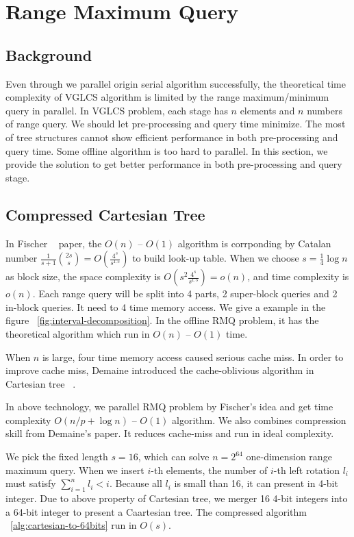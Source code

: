 \section{Range Maximum Query}
\label{sec:parallelRMQ}

\subsection{Background}

Even through we parallel origin serial algorithm successfully, the theoretical time complexity of VGLCS algorithm is limited by the range maximum/minimum query in parallel.  In VGLCS problem, each stage has $n$ elements and $n$ numbers of range query. We should let pre-processing and query time minimize. The most of tree structures cannot show efficient performance in both pre-processing and query time. Some offline algorithm is too hard to parallel. In this section, we provide the solution to get better performance in both pre-processing and query stage.

\subsection{Compressed Cartesian Tree}

In Fischer ~\cite{fischer} paper, the $O(n)$ -- $O(1)$ algorithm is corrponding by Catalan number $\frac{1}{s+1}\binom{2s}{s} = O(\frac{4^s}{s^{1.5}})$ to build look-up table. When we choose $s = \frac{1}{4} \log n$ as block size, the space complexity is $O(s^2 \frac{4^s}{s^{1.5}}) = o(n)$, and time complexity is $o(n)$. Each range query will be split into 4 parts, 2 super-block queries and 2 in-block queries. It need to 4 time memory access. We give a example in the figure ~\ref{fig:interval-decomposition}.  In the offline RMQ problem, it has the theoretical algorithm which run in $O(n)$ -- $O(1)$ time.

When $n$ is large, four time memory access caused serious cache miss.  In order to improve cache miss, Demaine introduced the cache-oblivious algorithm in Cartesian tree ~\cite{demaine}.

In above technology, we parallel RMQ problem by Fischer's idea and get time complexity $O(n / p + \log n)$ -- $O(1)$ algorithm. We also combines compression skill from Demaine's paper. It reduces cache-miss and run in ideal complexity.

We pick the fixed length $s = 16$, which can solve $n = 2^{64}$ one-dimension range maximum query. When we insert $i$-th elements, the number of $i$-th left rotation $l_i$ must satisfy $\sum_{i=1}^{n} l_i < i$. Because all $l_i$ is small than 16, it can present in 4-bit integer.  Due to above property of Cartesian tree, we merger 16 4-bit integers into a 64-bit integer to present a Caartesian tree. The compressed algorithm ~\ref{alg:cartesian-to-64bits} run in $O(s)$.

